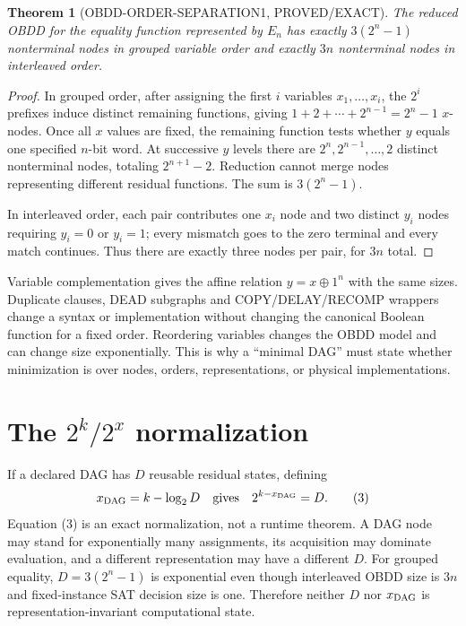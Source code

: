\documentclass[11pt]{article}
\newtheorem{theorem}{Theorem}
\begin{document}
\begin{theorem}[OBDD-ORDER-SEPARATION1, PROVED/EXACT]
The reduced OBDD for the equality function represented by $E_n$ has exactly
$3(2^n-1)$ nonterminal nodes in grouped variable order and exactly $3n$
nonterminal nodes in interleaved order.
\end{theorem}
\begin{proof}
In grouped order, after assigning the first $i$ variables $x_1,\ldots,x_i$,
the $2^i$ prefixes induce distinct remaining functions, giving
$1+2+\cdots+2^{n-1}=2^n-1$ $x$-nodes.  Once all $x$ values are fixed, the
remaining function tests whether $y$ equals one specified $n$-bit word.  At
successive $y$ levels there are $2^n,2^{n-1},\ldots,2$ distinct nonterminal
nodes, totaling $2^{n+1}-2$.  Reduction cannot merge nodes representing
different residual functions.  The sum is $3(2^n-1)$.

In interleaved order, each pair contributes one $x_i$ node and two distinct
$y_i$ nodes requiring $y_i=0$ or $y_i=1$; every mismatch goes to the zero
terminal and every match continues.  Thus there are exactly three nodes per
pair, for $3n$ total.
\end{proof}

Variable complementation gives the affine relation $y=x\oplus1^n$ with the
same sizes.  Duplicate clauses, DEAD subgraphs and COPY/DELAY/RECOMP wrappers
change a syntax or implementation without changing the canonical Boolean
function for a fixed order.  Reordering variables changes the OBDD model and
can change size exponentially.  This is why a ``minimal DAG'' must state
whether minimization is over nodes, orders, representations, or physical
implementations.

\section{The $2^k/2^x$ normalization}
If a declared DAG has $D$ reusable residual states, defining
\[
 x_{\rm DAG}=k-\log_2 D
 \quad\text{gives}\quad
 2^{k-x_{\rm DAG}}=D.                                      \tag{3}
\]
Equation (3) is an exact normalization, not a runtime theorem.  A DAG node
may stand for exponentially many assignments, its acquisition may dominate
evaluation, and a different representation may have a different $D$.
For grouped equality, $D=3(2^n-1)$ is exponential even though interleaved
OBDD size is $3n$ and fixed-instance SAT decision size is one.  Therefore
neither $D$ nor $x_{\rm DAG}$ is representation-invariant computational
state.
\end{document}
